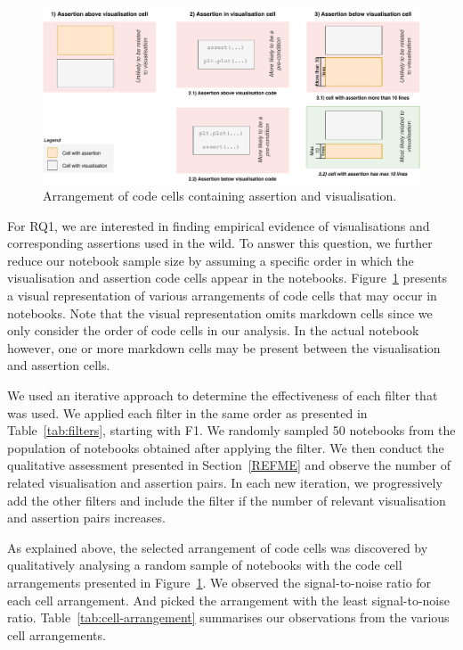 \documentclass[acmsmall,screen,review,anonymous]{acmart}
\begin{document}
\begin{figure}
  \centering
  \includegraphics[width=\textwidth]{nb-structure.pdf}
  \caption{Arrangement of code cells containing assertion and
    visualisation.}
  \label{fig:cell-arrangement}
\end{figure}

For RQ1, we are interested in finding empirical evidence of visualisations and corresponding assertions used in the wild. To answer this question, we further reduce our notebook sample size by assuming a specific order in which the visualisation and assertion code cells appear in the notebooks. Figure~\ref{fig:cell-arrangement} presents a visual representation of various arrangements of code cells that may occur in notebooks. Note that the visual representation omits markdown cells since we only consider the order of code cells in our analysis. In the actual notebook however, one or more markdown cells may be present between the visualisation and assertion cells.


We used an iterative approach to determine the effectiveness of each
filter that was used. We applied each filter in the same order as
presented in Table~\ref{tab:filters}, starting with F1. We randomly
sampled 50 notebooks from the population of notebooks obtained after
applying the filter. We then conduct the qualitative assessment
presented in Section~\ref{REFME} and observe the number of related
visualisation and assertion pairs. In each new iteration, we
progressively add the other filters and include the filter if the
number of relevant visualisation and assertion pairs increases.

As explained above, the selected arrangement of code cells was discovered by qualitatively analysing a random sample of notebooks with the code cell arrangements presented in Figure~\ref{fig:cell-arrangement}. We observed the signal-to-noise ratio for each cell arrangement. And picked the arrangement with the least signal-to-noise ratio. Table~\ref{tab:cell-arrangement} summarises our observations from the various cell arrangements.
\end{document}
